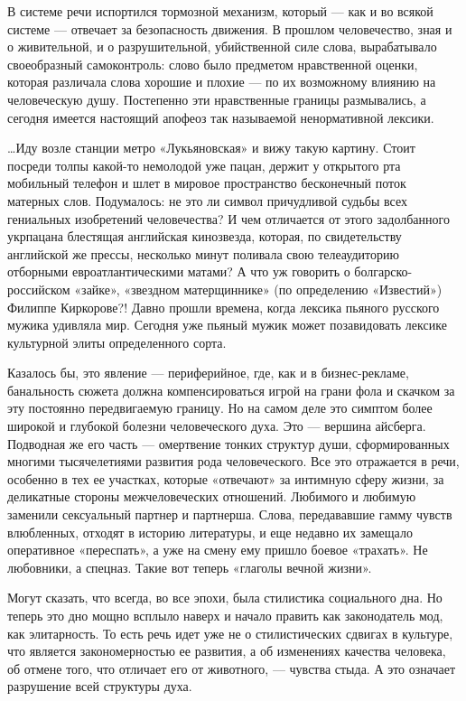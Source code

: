 В системе речи испортился тормозной механизм, который --- как и во всякой системе
--- отвечает за безопасность движения. В прошлом человечество, зная и о
живительной, и о разрушительной, убийственной силе слова, вырабатывало
своеобразный самоконтроль: слово было предметом нравственной оценки, которая
различала слова хорошие и плохие --- по их возможному влиянию на человеческую
душу. Постепенно эти нравственные границы размывались, а сегодня имеется
настоящий апофеоз так называемой ненормативной лексики.

…Иду возле станции метро «Лукьяновская» и вижу такую картину. Стоит посреди
толпы какой-то немолодой уже пацан, держит у открытого рта мобильный телефон и
шлет в мировое пространство бесконечный поток матерных слов. Подумалось: не это
ли символ причудливой судьбы всех гениальных изобретений человечества? И чем
отличается от этого задолбанного укрпацана блестящая английская кинозвезда,
которая, по свидетельству английской же прессы, несколько минут поливала свою
телеаудиторию отборными евроатлантическими матами? А что уж говорить о
болгарско-российском «зайке», «звездном матерщиннике» (по определению
«Известий») Филиппе Киркорове?! Давно прошли времена, когда лексика пьяного
русского мужика удивляла мир. Сегодня уже пьяный мужик может позавидовать
лексике культурной элиты определенного сорта.

Казалось бы, это явление --- периферийное, где, как и в бизнес-рекламе,
банальность сюжета должна компенсироваться игрой на грани фола и скачком за эту
постоянно передвигаемую границу. Но на самом деле это симптом более широкой и
глубокой болезни человеческого духа. Это --- вершина айсберга. Подводная же его
часть --- омертвение тонких структур души, сформированных многими тысячелетиями
развития рода человеческого. Все это отражается в речи, особенно в тех ее
участках, которые «отвечают» за интимную сферу жизни, за деликатные стороны
межчеловеческих отношений. Любимого и любимую заменили сексуальный партнер и
партнерша. Слова, передававшие гамму чувств влюбленных, отходят в историю
литературы, и еще недавно их замещало оперативное «переспать», а уже на смену
ему пришло боевое «трахать». Не любовники, а спецназ. Такие вот теперь «глаголы
вечной жизни».

Могут сказать, что всегда, во все эпохи, была стилистика социального дна. Но
теперь это дно мощно всплыло наверх и начало править как законодатель мод, как
элитарность. То есть речь идет уже не о стилистических сдвигах в культуре, что
является закономерностью ее развития, а об изменениях качества человека, об
отмене того, что отличает его от животного, --- чувства стыда. А это означает
разрушение всей структуры духа.

